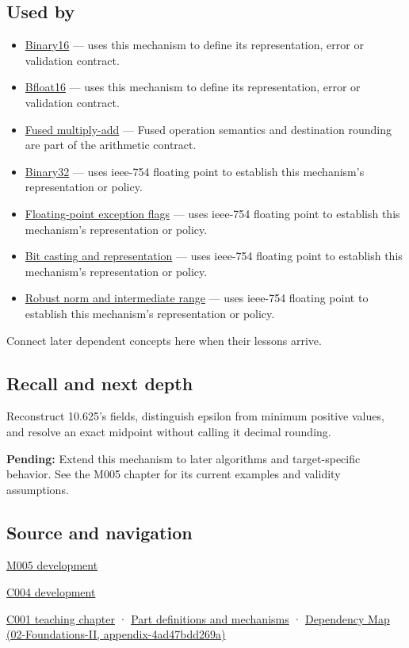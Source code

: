 \subsection{Used by}\label{appendix-343615f49ddf-used-by}

\begin{itemize}
\item
  \hyperref[appendix-34443cec7170]{Binary16} --- uses this mechanism to define its representation, error or validation contract.
\item
  \hyperref[appendix-18b8dd966b5d]{Bfloat16} --- uses this mechanism to define its representation, error or validation contract.
\item
  \hyperref[appendix-41e8ef22a21e]{Fused multiply-add} --- Fused operation semantics and destination rounding are part of the arithmetic contract.
\item
  \hyperref[appendix-5057f9ad327f]{Binary32} --- uses ieee-754 floating point to establish this mechanism's representation or policy.
\item
  \hyperref[appendix-ed8531b46754]{Floating-point exception flags} --- uses ieee-754 floating point to establish this mechanism's representation or policy.
\item
  \hyperref[appendix-34ee45f161c1]{Bit casting and representation} --- uses ieee-754 floating point to establish this mechanism's representation or policy.
\item
  \hyperref[appendix-7f1e17dcafb1]{Robust norm and intermediate range} --- uses ieee-754 floating point to establish this mechanism's representation or policy.
\end{itemize}

Connect later dependent concepts here when their lessons arrive.

\subsection{Recall and next depth}\label{appendix-343615f49ddf-recall-and-next-depth}

Reconstruct 10.625's fields, distinguish epsilon from minimum positive values, and resolve an exact midpoint without calling it decimal rounding.

\textbf{Pending:} Extend this mechanism to later algorithms and target-specific behavior. See the M005 chapter for its current examples and validity assumptions.

\subsection{Source and navigation}\label{appendix-343615f49ddf-source-and-navigation}

\hyperref[01-foundations-i-ch001-when-arithmetic-meets-uncertainty]{M005 development}

\hyperref[01-foundations-i-ch001-a-stretching-ruler-for-real-valued-quantities]{C004 development}

\hyperref[01-foundations-i-ch001-from-a-signal-to-an-interpretation]{C001 teaching chapter} · \hyperref[appendix-fd090d982a15]{Part definitions and mechanisms} · \href{../02-Foundations-II/main.pdf\#nameddest=appendix-4ad47bdd269a}{Dependency Map (02-Foundations-II, appendix-4ad47bdd269a)}
